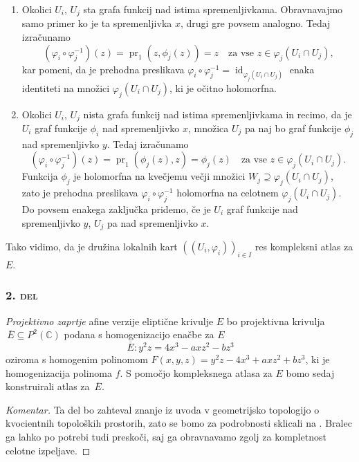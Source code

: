 \documentclass[mat1]{fmfdelo}
\numberwithin{equation}{section}
\newcommand{\PC}{P^2(\mathbb C)}
\newcommand{\inv}{^{-1}}
\newcommand{\olsi}[1]{\,\overline{\!{#1}}} %
\DeclareMathOperator{\id}{id}
\DeclareMathOperator{\pr}{pr}
\theoremstyle{definition}
\newenvironment{komentar}[1][Komentar]{\begin{proof}[#1]\let\qed\relax}{\end{proof}}
\begin{document}
\begin{enumerate}
    \item Okolici $U_i$, $U_j$ sta grafa funkcij nad istima spremenljivkama. Obravnavajmo samo primer ko je ta spremenljivka $x$, drugi gre povsem analogno. Tedaj izračunamo
    \[
        (\varphi_i \circ \varphi_j\inv)(z) = \pr_1(z, \phi_j(z)) = z \quad \text{za vse $z \in \varphi_j(U_i \cap U_j)$,}
    \] 
    kar pomeni, da je prehodna preslikava $\varphi_i \circ \varphi_j\inv = \id_{\varphi_j(U_i \cap U_j)}$ enaka identiteti na množici $\varphi_j(U_i \cap U_j)$, ki je očitno holomorfna. 

    \item Okolici $U_i$, $U_j$ nista grafa funkcij nad istima spremenljivkama in recimo, da je $U_i$ graf funkcije $\phi_i$ nad spremenljivko $x$, množica $U_j$ pa naj bo graf funkcije $\phi_j$ nad spremenljivko $y$. Tedaj izračunamo
    \[
        (\varphi_i \circ \varphi_j\inv)(z) = \pr_1(\phi_j(z), z) = \phi_j(z) \quad \text{za vse $z \in \varphi_j(U_i \cap U_j)$.}   
    \]
    Funkcija $\phi_j$ je holomorfna na kvečjemu večji množici $W_j \supseteq \varphi_j(U_i \cap U_j)$, zato je prehodna preslikava $\varphi_i \circ \varphi_j\inv$ holomorfna na celotnem $\varphi_j(U_i \cap U_j)$. Do povsem enakega zaključka pridemo, če je $U_i$ graf funkcije nad spremenljivko $y$, $U_j$ pa nad spremenljivko $x$. 
\end{enumerate} 
Tako vidimo, da je družina lokalnih kart $((U_i, \varphi_i))_{i \in I}$ res kompleksni atlas za $E$. 

\subsubsection*{\textsc{2. del}} \emph{Projektivno zaprtje} afine verzije eliptične krivulje $E$ bo projektivna krivulja $\olsi{E} \subseteq \PC$ podana s homogenizacijo enačbe za $E$
\[
    \olsi{E} : y^2z = 4x^3 - axz^2 - bz^3  
\]
oziroma s homogenim polinomom $F(x,y,z) = y^2z - 4x^3 + axz^2 + bz^3$, ki je homogenizacija polinoma $f$. S pomočjo kompleksnega atlasa za $E$ bomo sedaj konstruirali atlas za $\olsi{E}$. 

\begin{komentar}
    Ta del bo zahteval znanje iz uvoda v geometrijsko topologijo o kvocientnih topoloških prostorih, zato se bomo za podrobnosti sklicali na \cite[poglavje 3.2.]{MrcunTop}. Bralec ga lahko po potrebi tudi preskoči, saj ga obravnavamo zgolj za kompletnost celotne izpeljave. 
\end{komentar}
\end{document}

